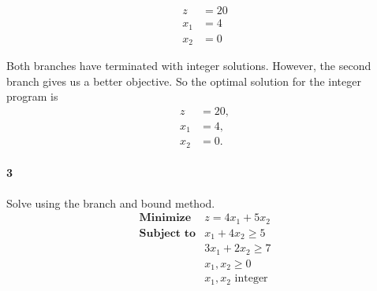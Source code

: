 \documentclass[12pt]{article}
\newenvironment{fullbox}{\begin{lrbox}{\savefullbox}\begin{minipage}{\dimexpr\textwidth-2\fboxsep\relax}}{\end{minipage}\end{lrbox}\begin{center}\framebox[\textwidth]{\usebox{\savefullbox}}\end{center}}
\newenvironment{pbox}[1][]{\begin{fullbox}\ifx#1\empty\else\paragraph{#1}\fi}{\end{fullbox}}
\theoremstyle{definition}
\begin{document}
\begin{center}
\begin{minipage}{0.4\textwidth}
        \begin{align*}
            z &= 20 \\
            x_1 &= 4 \\
            x_2 &= 0
        \end{align*}
    \end{minipage}
\end{center}
Both branches have terminated with integer solutions. However, the second branch gives us a better objective. So the optimal solution for the integer program is
\begin{align*}
    z &= 20, \\
    x_1 &= 4, \\
    x_2 &= 0.
\end{align*}



\newpage
\begin{pbox}[3]
    Solve using the branch and bound method.
    \[\begin{array}{ll}
        \textbf{Minimize} & z = 4x_1 + 5x_2 \\
        \textbf{Subject to} & x_1 + 4x_2 \geq 5 \\
            & 3x_1 + 2x_2 \geq 7 \\
            & x_1, x_2 \geq 0 \\
            & x_1, x_2 \text{ integer}
    \end{array}\]
\end{pbox}
\end{document}
